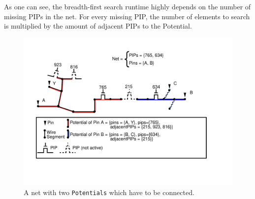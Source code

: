 As one can see, the breadth-first search runtime highly depends on the number of missing PIPs in the net. For every missing PIP, the number of elements to search is multiplied by the amount of adjacent PIPs to the Potential.

\begin{figure}[h]
\centering
\includegraphics[scale=0.65]{images/brokenpotentials.pdf}
\caption{A net with two \texttt{Potentials} which have to be connected.}
\label{fig:brokenpotentials}
\end{figure}



